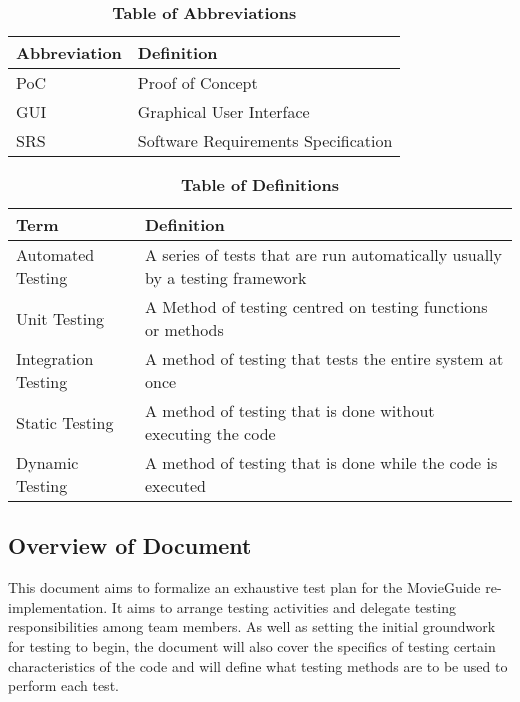 \documentclass[12pt, titlepage]{article}
\begin{document}
\begin{table}[hbp]
\caption{\textbf{Table of Abbreviations}} \label{Table}

\begin{tabularx}{\textwidth}{p{3cm}X}
\toprule
\textbf{Abbreviation} & \textbf{Definition} \\
\midrule
PoC & Proof of Concept\\
GUI & Graphical User Interface\\
SRS & Software Requirements Specification\\
\bottomrule
\end{tabularx}

\end{table}

\begin{table}[!htbp]
\caption{\textbf{Table of Definitions}} \label{Table}

\begin{tabularx}{\textwidth}{p{3.5cm}X}
\toprule
\textbf{Term} & \textbf{Definition}\\
\midrule
Automated Testing & A series of tests that are run automatically usually by a testing framework\\
Unit Testing & A Method of testing centred on testing functions or methods\\
Integration Testing & A method of testing that tests the entire system at once\\
Static Testing & A method of testing that is done without executing the code\\
Dynamic Testing & A method of testing that is done while the code is executed\\

\bottomrule
\end{tabularx}

\end{table}	

\subsection{Overview of Document}
This document aims to formalize an exhaustive test plan for the MovieGuide re-implementation. It aims to arrange testing activities and delegate testing responsibilities among team members. As well as setting the initial groundwork for testing to begin, the document will also cover the specifics of testing certain characteristics of the code and will define what testing methods are to be used to perform each test.
\end{document}
